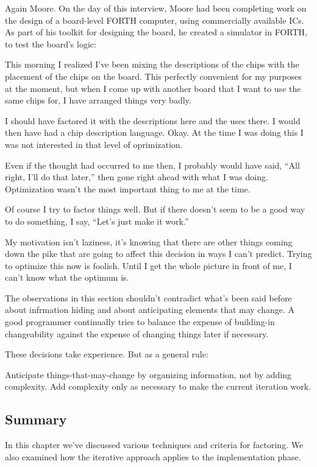 \blackline{2ex}
Again Moore. On the day of this interview, Moore had been completing work on the design of a board-level FORTH computer, using commercially available ICs. As part of his toolkit for designing the board, he created a simulator in FORTH, to test the board's logic:

\begin{tfquot}
This morning I realized I've been mixing the descriptions of the chips with the placement of the chips on the board. This perfectly convenient for my purposes at the moment, but when I come up with another board that I want to use the same chips for, I have arranged things very badly.

I should have factored it with the descriptions here and the uses there. I would then have had a chip description language. Okay. At the time I was doing this I was not interested in that level of oprimization.

Even if the thought had occurred to me then, I probably would have said, ``All right, I'll do that later,'' then gone right ahead with what I was doing. Optimization wasn't the most important thing to me at the time.

Of course I try to factor things well. But if there doesn't seem to be a good way to do something, I say, ``Let's just make it work.''

My motivation isn't laziness, it's knowing that there are other things coming down the pike that are going to affect this decision in ways I can't predict. Trying to optimize this now is foolish. Until I get the whole picture in front of me, I can't know what the optimum is.
\end{tfquot}
\blackline{1ex}
The observations in this section shouldn't contradict what's been said before about infrmation hiding and about anticipating elements that may change. A good programmer continually tries to balance the expense of building-in changeability against the expense of changing things later if necessary.

These decisions take experience. But as a general rule:

\begin{tip}
Anticipate things-that-may-change by organizing information, not by
adding complexity. Add complexity only as necessary to make the
current iteration work.
\end{tip}

\subsection{Summary}
In this chapter we've discussed various techniques and criteria for factoring. We also examined how the iterative approach applies to the implementation phase.

